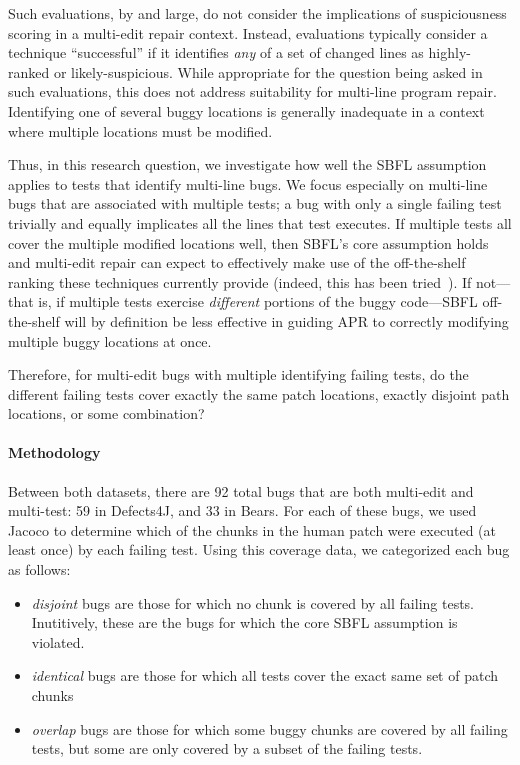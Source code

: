Such evaluations, by and large, do not consider the implications of
suspiciousness scoring in a multi-edit repair context.  Instead, evaluations
typically consider a technique ``successful'' if it identifies \emph{any} of a
set of changed lines as highly-ranked or likely-suspicious.  While appropriate
for the question being asked in such evaluations, this does not address
suitability for multi-line program repair.  Identifying one of several buggy
locations is generally inadequate in a context where multiple locations must be
modified.  

Thus, in this research question, we investigate how well the SBFL assumption
applies to tests that identify multi-line bugs. We focus especially on
multi-line bugs that are associated with multiple tests; a bug with only a single failing test 
trivially and equally implicates all the lines that test executes.  If multiple tests all cover the 
multiple
modified locations well, then SBFL's core assumption holds and multi-edit repair
can expect to effectively make use of the off-the-shelf ranking these techniques
currently provide (indeed, this has been tried~\cite{angelix}). If not---that
is, if multiple tests exercise \emph{different} portions of the buggy
code---SBFL off-the-shelf will by definition be less effective in guiding APR to
correctly modifying multiple buggy locations at once.

Therefore, for multi-edit bugs with multiple identifying failing tests, do the 
different failing tests cover exactly the same patch locations, exactly 
disjoint path locations, or some combination?



\paragraph{Methodology}

Between both datasets, there are 92 total bugs that are both multi-edit and 
multi-test: 59 in Defects4J, and 33 in Bears.  For each of these bugs, we used 
Jacoco to determine which of the chunks in the human patch were executed (at
least once) by each failing test. Using 
this coverage data, we categorized each bug as follows:
\begin{itemize}
\item \emph{disjoint} bugs are those for which no chunk is covered by all
failing tests.  Inutitively, these are the bugs for which the core SBFL
assumption is violated.
\item \emph{identical} bugs are those for which all tests cover the exact same set of
  patch chunks
\item \emph{overlap} bugs are those for which some buggy chunks are covered by
  all failing tests, but some are only covered by a subset of the failing tests.
\end{itemize}


